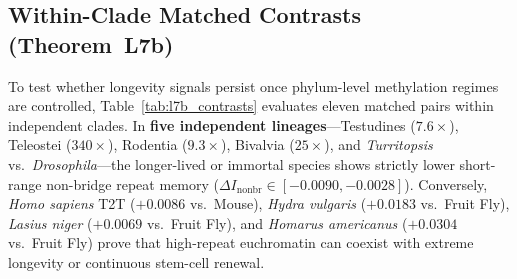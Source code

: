\documentclass[11pt,a4paper]{article}
\renewcommand{\_}{\origunderscore\penalty200\relax}
\theoremstyle{remark}
\begin{document}
\subsection{Within-Clade Matched Contrasts (Theorem~L7b)}
To test whether longevity signals persist once phylum-level methylation regimes are controlled, Table~\ref{tab:l7b_contrasts} evaluates eleven matched pairs within independent clades.
In \textbf{five independent lineages}---Testudines ($7.6\times$), Teleostei ($340\times$), Rodentia ($9.3\times$), Bivalvia ($25\times$), and \textit{Turritopsis} vs.\ \textit{Drosophila}---the longer-lived or immortal species shows strictly lower short-range non-bridge repeat memory ($\Delta I_{\mathrm{nonbr}} \in [-0.0090, -0.0028]$).
Conversely, \textit{Homo sapiens} T2T ($+0.0086$ vs.\ Mouse), \textit{Hydra vulgaris} ($+0.0183$ vs.\ Fruit Fly), \textit{Lasius niger} ($+0.0069$ vs.\ Fruit Fly), and \textit{Homarus americanus} ($+0.0304$ vs.\ Fruit Fly) prove that high-repeat euchromatin can coexist with extreme longevity or continuous stem-cell renewal.
\end{document}
